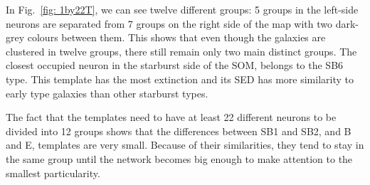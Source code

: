             In Fig.~\ref{fig: 1by22T}, we can see twelve different groups:
            5 groups in the left-side neurons are separated from 7 groups on the right side of the map with two dark-grey colours between them.
            This shows that even though the galaxies are clustered in twelve groups, there still remain only two main distinct groups.
            The closest occupied neuron in the starburst side of the SOM, belongs to the SB6 type. 
            This template has the most extinction and its SED has more similarity to early type galaxies than other starburst types. 
            
            The fact that the templates need to have at least 22 different neurons to be divided into 12 groups shows that the differences between SB1 and SB2, and B and E, templates are very small.
            Because of their similarities, they tend to stay in the same group until the network becomes big enough to make attention to the smallest particularity.
           
